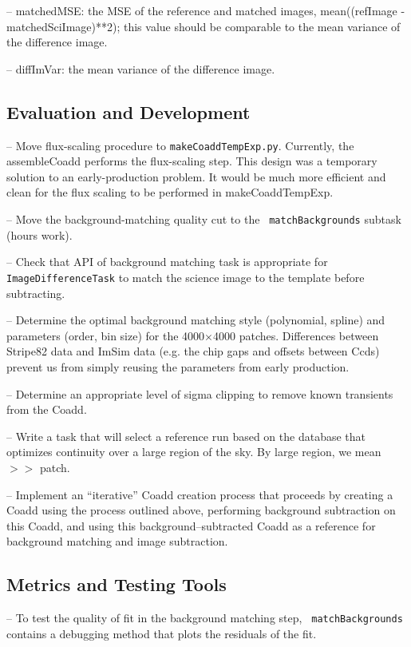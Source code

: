 \documentclass[prd, nofootinbib, floatfix, 11pt,tightenlines,times]{article}
\begin{document}
-- matchedMSE: the MSE of the reference and matched images, mean((refImage - matchedSciImage)**2); 
   this value should be comparable to the mean variance of the difference image.

-- diffImVar: the mean variance of the difference image.

\subsection{Evaluation and Development}

-- Move flux-scaling procedure to {\tt makeCoaddTempExp.py}.
Currently, the assembleCoadd performs the flux-scaling step. This
design was a temporary solution to an early-production problem.  It
would be much more efficient and clean for the flux scaling to be
performed in makeCoaddTempExp.

-- Move the background-matching quality cut to the {\tt
  matchBackgrounds} subtask (hours work).

-- Check that API of background matching task is appropriate for {\tt
  ImageDifferenceTask} to match the science image to the template
before subtracting.

-- Determine the optimal background matching style (polynomial,
spline) and parameters (order, bin size) for the 4000$\times$4000
patches. Differences between Stripe82 data and ImSim data (e.g. the
chip gaps and offsets between Ccds) prevent us from simply reusing the
parameters from early production.

-- Determine an appropriate level of sigma clipping to remove known
transients from the Coadd.

-- Write a task that will select a reference run based on the database
that optimizes continuity over a large region of the sky.  By large
region, we mean $>>$ patch.

-- Implement an ``iterative'' Coadd creation process that proceeds by
creating a Coadd using the process outlined above, performing
background subtraction on this Coadd, and using this
background--subtracted Coadd as a reference for background matching
and image subtraction.

\subsection{Metrics and Testing Tools}

-- To test the quality of fit in the background matching step, {\tt
  matchBackgrounds} contains a debugging method that plots the
residuals of the fit.
\end{document}
